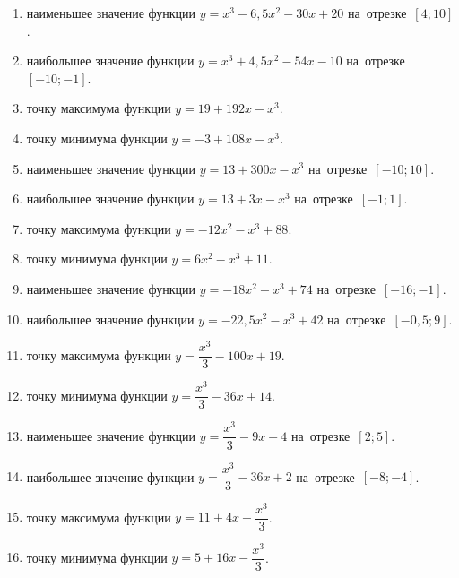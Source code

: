 \documentclass[a4paper,10pt]{article}
\begin{document}
\begin{enumerate}
\item {} наименьшее значение функции $y=x^3 -6,5x^2-30x+20$ на~отрезке~$\left[4;10\right]$.

\item {} наибольшее значение функции $y=x^3 +4,5x^2-54x-10$ на~отрезке~$\left[-10;-1\right]$.

\item {} точку максимума функции $y=19+192x-x^3$.

\item {} точку минимума функции $y=-3+108x-x^3$.

\item {} наименьшее значение функции $y=13+300x-x^3$ на~отрезке~$\left[-10;10\right]$.

\item {} наибольшее значение функции $y=13+3x-x^3$ на~отрезке~$\left[-1;1\right]$.

\item {} точку максимума функции $y=-12x^2-x^3+88$.

\item {} точку минимума функции $y=6x^2-x^3+11$.

\item {} наименьшее значение функции $y=-18x^2-x^3+74$ на~отрезке~$\left[-16;-1\right]$.

\item {} наибольшее значение функции $y=-22,5x^2-x^3+42$ на~отрезке~$\left[-0,5;9\right]$.

\item {} точку максимума функции $y=\dfrac{x^3}{3} -100x+19$.

\item {} точку минимума функции $y=\dfrac{x^3}{3} -36x+14$.

\item {} наименьшее значение функции $y=\dfrac{x^3}{3} -9x+4$ на~отрезке~$\left[2;5\right]$.

\item {} наибольшее значение функции $y=\dfrac{x^3}{3} -36x+2$ на~отрезке~$\left[-8;-4\right]$.

\item {} точку максимума функции $y=11 +4x-\dfrac{x^3}{3}$.

\item {} точку минимума функции $y=5 +16x-\dfrac{x^3}{3}$.


\end{enumerate}
\end{document}

